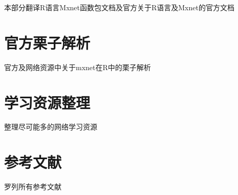 \documentclass[]{book}
\begin{document}
本部分翻译R语言Mxnet函数包文档及官方关于R语言及Mxnet的官方文档

\chapter{官方栗子解析}

官方及网络资源中关于mxnet在R中的栗子解析

\chapter{学习资源整理}

整理尽可能多的网络学习资源

\chapter{参考文献}

罗列所有参考文献


\end{document}
